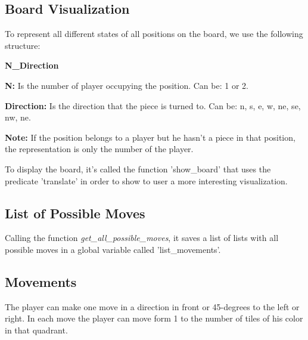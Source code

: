 \documentclass[a4paper]{article}
\begin{document}
\vspace{10mm}

\subsection{Board Visualization} 
To represent all different states of all positions on the board, we use the following structure:

\begin{center}
\textbf{N\_Direction}
\end{center}

\textbf{N:} Is the number of player occupying the position.  Can be: 1 or 2.

\textbf{Direction:} Is the direction that the piece is turned to. Can be: n, s, e, w, ne, se, nw, ne.


\vspace{5mm}
\textbf{Note:}  If the position belongs to a player but he hasn’t a piece in that position, the representation is only the number of the player.

\vspace{5mm}

To display the board, it's called the function 'show\_board' that uses the predicate 'translate' in order to show to user a more interesting visualization. 

\subsection{List of Possible Moves} 
Calling the function \textit{get\_all\_possible\_moves}, it saves a list of lists with all possible moves in a global variable called 'list\_movements'.

\subsection{Movements} 
The player can make one move in a direction in front or 45-degrees to the left or right. In each move the player can move form 1 to the number of tiles of his color in that quadrant.
\end{document}
